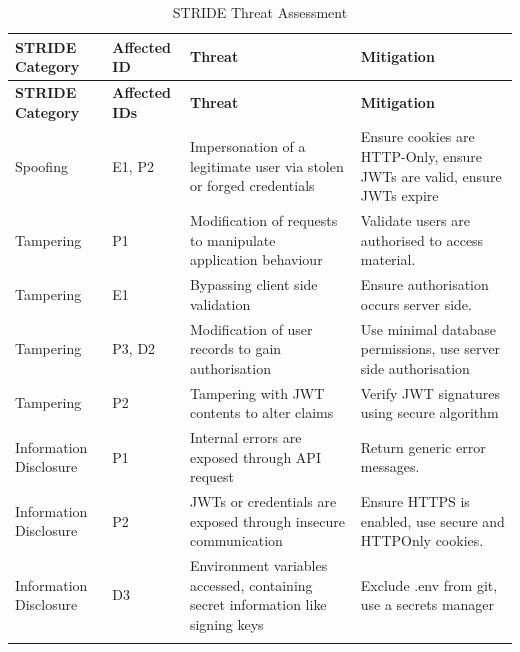 \begin{longtable}{|p{2cm}|p{1.4cm}|p{5.6cm}|p{5cm}|}
    \hline

    \textbf{STRIDE Category} &
    \textbf{Affected ID} &
    \textbf{Threat} &
    \textbf{Mitigation} \\
    \hline
    \endfirsthead

    \hline
    \textbf{STRIDE Category} &
    \textbf{Affected IDs} &
    \textbf{Threat} &
    \textbf{Mitigation} \\
    \hline
    \endhead

    Spoofing & E1, P2 &
    Impersonation of a legitimate user via stolen or forged credentials &
    Ensure cookies are HTTP-Only, ensure JWTs are valid, ensure JWTs expire \\ \hline
    
    Tampering & P1 &
    Modification of requests to manipulate application behaviour &
    Validate users are authorised to access material. \\ \hline
    
    Tampering & E1 &
    Bypassing client side validation &
    Ensure authorisation occurs server side. \\ \hline
    
    Tampering & P3, D2 &
    Modification of user records to gain authorisation &
    Use minimal database permissions, use server side authorisation \\ \hline
    
    Tampering & P2 &
    Tampering with JWT contents to alter claims &
    Verify JWT signatures using secure algorithm \\ \hline
    
    Information Disclosure & P1 &
    Internal errors are exposed through API request &
    Return generic error messages. \\ \hline
    
    Information Disclosure & P2 &
    JWTs or credentials are exposed through insecure communication &
    Ensure HTTPS is enabled, use secure and HTTPOnly cookies. \\ \hline
    
    Information Disclosure & D3 &
    Environment variables accessed, containing secret information like signing keys &
    Exclude .env from git, use a secrets manager \\ \hline

    



    
    \caption{STRIDE Threat Assessment}
    \label{tab:stride}   
    
\end{longtable}